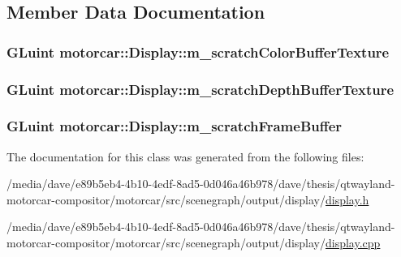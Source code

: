 \subsection{Member Data Documentation}
\hypertarget{classmotorcar_1_1Display_a8948636502d6498b53fbb644a9064390}{
\subsubsection[{m\-\_\-scratch\-Color\-Buffer\-Texture}]{\setlength{\rightskip}{0pt plus 5cm}G\-Luint motorcar\-::\-Display\-::m\-\_\-scratch\-Color\-Buffer\-Texture\hspace{0.3cm}{\ttfamily [protected]}}}\label{classmotorcar_1_1Display_a8948636502d6498b53fbb644a9064390}
\hypertarget{classmotorcar_1_1Display_a32e11a89219cf0727cd85b19a30f21a6}{
\subsubsection[{m\-\_\-scratch\-Depth\-Buffer\-Texture}]{\setlength{\rightskip}{0pt plus 5cm}G\-Luint motorcar\-::\-Display\-::m\-\_\-scratch\-Depth\-Buffer\-Texture\hspace{0.3cm}{\ttfamily [protected]}}}\label{classmotorcar_1_1Display_a32e11a89219cf0727cd85b19a30f21a6}
\hypertarget{classmotorcar_1_1Display_a23f2535f375102eda1ba2cba2b2a03a4}{
\subsubsection[{m\-\_\-scratch\-Frame\-Buffer}]{\setlength{\rightskip}{0pt plus 5cm}G\-Luint motorcar\-::\-Display\-::m\-\_\-scratch\-Frame\-Buffer\hspace{0.3cm}{\ttfamily [protected]}}}\label{classmotorcar_1_1Display_a23f2535f375102eda1ba2cba2b2a03a4}


The documentation for this class was generated from the following files\-:\begin{DoxyCompactItemize}
\item 
/media/dave/e89b5eb4-\/4b10-\/4edf-\/8ad5-\/0d046a46b978/dave/thesis/qtwayland-\/motorcar-\/compositor/motorcar/src/scenegraph/output/display/\hyperlink{display_8h}{display.\-h}\item 
/media/dave/e89b5eb4-\/4b10-\/4edf-\/8ad5-\/0d046a46b978/dave/thesis/qtwayland-\/motorcar-\/compositor/motorcar/src/scenegraph/output/display/\hyperlink{display_8cpp}{display.\-cpp}\end{DoxyCompactItemize}
